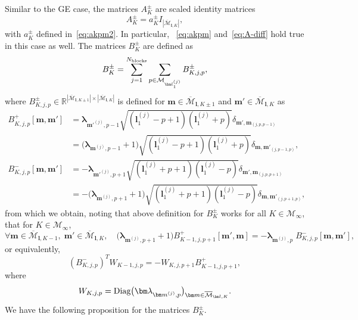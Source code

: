 \documentclass{article}
\newcommand{\blamb}[2]{\bm\lambda^{#1}_{#2}}
\newcommand{\card}[1]{|{#1}|}
\numberwithin{equation}{section}
\def\R{\mathbb{R}}
\def\Nb{{N_{\rm blocks}}}
\def\bl{{\bm l}}
\def\bbm{{\bm m}}
\def\calM{\mathcal{M}}
\def\oMlK{\overline{\calM}_{\bl,K}}
\def\Apm{A^{\pm}}
\def\Bpm{B^{\pm}}
\def\Bp{B^{+}}
\def\Bm{B^{-}}
\begin{document}
Similar to the GE case, the matrices $\Apm_{K}$ are scaled identity matrices
\begin{equation*}
    \Apm_{K} = a^\pm_K I_{\card{\overline{\calM}_{\bl,K}}},
\end{equation*}
with $a^\pm_K$ defined in~\eqref{eq:akpm2}. In particular, ~\eqref{eq:akpm} and~\eqref{eq:A-diff} hold true in this case as well. 
The matrices $\Bpm_{K}$ are defined as
\[  
    \Bpm_{K}=\sum_{j=1}^\Nb\sum_{p\in\calM_{\bl^{(j)}_1}} \Bpm_{K,j,p}, 
\]
where $\Bpm_{K,j,p}\in\R^{\card{\overline{\calM}_{\bl,K\pm1}}\times\card{\oMlK}}$ is defined for $\bbm\in \overline{\calM}_{\bl,K\pm1}$ and $\bbm'\in\oMlK$ as
\begin{equation}\label{eq:Bpm-pi}
\begin{split}
    \Bp_{K,j,p}[\bbm,\bbm'] & = \blamb{}{{\bbm'}^{(j)},p-1}\sqrt{(\bl^{(j)}_1-p+1)(\bl^{(j)}_1+p)}\delta_{\bbm',\bbm_{(j,p,p-1)}} \\
    & = \big(\blamb{}{\bbm^{(j)},p-1}+1\big)\sqrt{(\bl^{(j)}_1-p+1)(\bl^{(j)}_1+p)}\delta_{\bbm,\bbm'_{(j,p-1,p)}}, \\
     \Bm_{K,j,p}[\bbm,\bbm'] & = 
    -\blamb{}{\bbm'^{(j)},p+1}\sqrt{(\bl^{(j)}_1+p+1)(\bl^{(j)}_1-p)}\delta_{\bbm',\bbm_{(j,p,p+1)}} \\
    & = -\big(\blamb{}{\bbm^{(j)},p+1}+1\big)\sqrt{(\bl^{(j)}_1+p+1)(\bl^{(j)}_1-p)}\delta_{\bbm,\bbm'_{(j,p+1,p)}}, 
\end{split}
\end{equation}
from which we obtain, noting that above definition for $B^\pm_K$ works for all $K\in\calM_\infty$, that for $K\in\calM_\infty$,
\begin{equation}
\label{eq:Bequality-pi}
    \forall\bbm\in\overline{\calM}_{\bl,K-1}, \;\bbm'\in\oMlK, \quad \big(\blamb{}{{\bbm}^{(j)},p+1}+1\big)\Bp_{K-1,j,p+1}[\bbm',\bbm] = -\blamb{}{\bbm^{(j)},p}\;\Bm_{{K,j,p}}[\bbm,\bbm'],
\end{equation}
or equivalently,
\begin{equation*}
    (\Bm_{{K,j,p}})^TW_{K-1,j,p} = -W_{K,j,p+1}\Bp_{K-1,j,p+1}, 
\end{equation*}
where 
\[
    W_{K,j,p} = \textup{Diag}\big(\blamb{}{{\bbm}^{(j)},p}\big)_{\bbm\in\overline{\calM}_{\bl,K}}.
\]
We have the following proposition for the matrices $\Bpm_{K}$.
\end{document}
